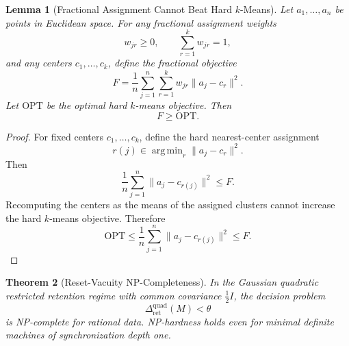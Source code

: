 \documentclass[12pt]{article}
\newtheorem{theorem}{Theorem}[section]
\newtheorem{lemma}[theorem]{Lemma}
\theoremstyle{definition}
\DeclareMathOperator*{\argmin}{arg\,min}
\newcommand{\RetQuad}{\Delta_{\mathrm{ret}}^{\mathrm{quad}}}
\begin{document}
\begin{lemma}[Fractional Assignment Cannot Beat Hard $k$-Means]
\label{lem:fractional-kmeans}
Let $a_1,\dots,a_n$ be points in Euclidean space.  For any fractional
assignment weights
\[
w_{jr}\ge0,
\qquad
\sum_{r=1}^k w_{jr}=1,
\]
and any centers $c_1,\dots,c_k$, define the fractional objective
\[
F
=
\frac1n
\sum_{j=1}^n
\sum_{r=1}^k
w_{jr}
\|a_j-c_r\|^2.
\]
Let $\mathrm{OPT}$ be the optimal hard $k$-means objective.  Then
\[
F\ge \mathrm{OPT}.
\]
\end{lemma}

\begin{proof}
For fixed centers $c_1,\dots,c_k$, define the hard nearest-center assignment
\[
r(j)\in\argmin_r\|a_j-c_r\|^2.
\]
Then
\[
\frac1n
\sum_{j=1}^n
\|a_j-c_{r(j)}\|^2
\le
F.
\]
Recomputing the centers as the means of the assigned clusters cannot increase
the hard $k$-means objective.  Therefore
\[
\mathrm{OPT}
\le
\frac1n
\sum_{j=1}^n
\|a_j-c_{r(j)}\|^2
\le
F.
\]
\end{proof}

\begin{theorem}[Reset-Vacuity NP-Completeness]
\label{thm:retention-reset-np}
In the Gaussian quadratic restricted retention regime with common covariance
$\frac12 I$, the decision problem
\[
\RetQuad(M)<\theta
\]
is NP-complete for rational data.  NP-hardness holds even for minimal definite
machines of synchronization depth one.
\end{theorem}
\end{document}
